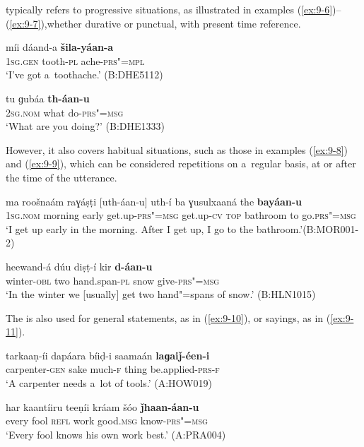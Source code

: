  typically refers to progressive situations, as illustrated in examples (\ref{ex:9-6})--(\ref{ex:9-7}),whether durative or punctual, with present time reference.

\begin{exe}
\ex
\label{ex:9-6}
\gll míi dáand-a \textbf{šila-yáan-a} \\
\textsc{1sg.gen} tooth-\textsc{pl} ache-\textsc{prs"=mpl} \\
\glt `I've got a~toothache.' (B:DHE5112)

\ex
\label{ex:9-7}
\gll tu ɡubáa \textbf{th-áan-u} \\
\textsc{2sg.nom} what do-\textsc{prs"=msg} \\
\glt `What are you doing?' (B:DHE1333)
\end{exe}

However, it also covers habitual situations, such as those in examples (\ref{ex:9-8}) and (\ref{ex:9-9}), which can be considered repetitions on a~regular basis, at or after the time of the utterance. 

\begin{exe}
\ex
\label{ex:9-8}
\gll ma roošnaám raɣáṣṭi [uth-áan-u] uth-í ba ɣusulxaaná the \textbf{bayáan-u} \\
\textsc{1sg.nom} morning early get.up-\textsc{prs"=msg} get.up-\textsc{cv}  \textsc{top} bathroom to go.\textsc{prs"=msg} \\
\glt `I get up early in the morning. After I get up, I go to the bathroom.'\newline (B:MOR001-2)

\ex
\label{ex:9-9}
\gll heewand-á dúu diṣṭ-í kir \textbf{d-áan-u} \\
winter-\textsc{obl} two hand.span-\textsc{pl} snow give-\textsc{prs"=msg} \\
\glt `In the winter we [usually] get two hand"=spans of snow.' (B:HLN1015)
\end{exe}

The  is also used for general statements, as in (\ref{ex:9-10}), or sayings, as in (\ref{ex:9-11}).

\begin{exe}
\ex
\label{ex:9-10}
\gll tarkaaṇ-íi dapáara bíiḍ-i saamaán \textbf{laɡaiǰ-éen-i}  \\
carpenter-\textsc{gen} sake much-\textsc{f} thing be.applied-\textsc{prs-f} \\
\glt `A carpenter needs a~lot of tools.' (A:HOW019)

\ex
\label{ex:9-11}
\gll har kaantíiru teeṇíi kráam šóo \textbf{ǰhaan-áan-u} \\
every fool \textsc{refl} work good.\textsc{msg} know-\textsc{prs"=msg} \\
\glt `Every fool knows his own work best.' (A:PRA004)
\end{exe}

